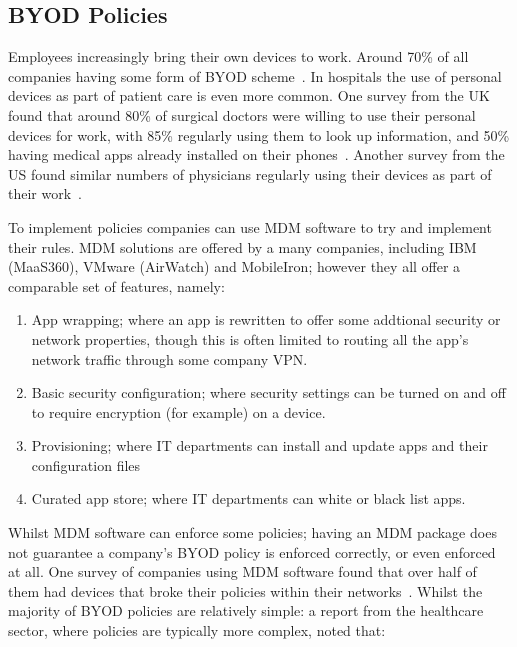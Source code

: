 \documentclass[a4paper]{scrartcl}
\begin{document}
\subsection{BYOD Policies}
\label{sec:byod}

Employees increasingly bring their own devices to work. Around 70\% of all
companies having some form of \ac{BYOD} scheme~\cite{schulze_byod_2016}. In
hospitals the use of personal devices as part of patient care is even more
common. One survey from the UK found that around 80\% of surgical doctors were
willing to use their personal devices for work, with 85\% regularly using them
to look up information, and 50\% having medical apps already installed on their
phones~\cite{patel_uk_2015}. Another survey from the US found similar numbers of
physicians regularly using their devices as part of their
work~\cite{moyer_managing_2013}.

To implement policies companies can use \ac{MDM} software to try and implement
their rules.  \ac{MDM} solutions are offered by a many companies, including IBM
(MaaS360), VMware (AirWatch) and MobileIron; however they all offer a
comparable set of features, namely:
\begin{enumerate}
\item App wrapping; where an app is rewritten to offer some addtional security
  or network properties, though this is often limited to routing all the app's
  network traffic through some company VPN.
\item Basic security configuration; where security settings can be turned on and
  off to require encryption (for example) on a device.
\item Provisioning; where IT departments can install and update apps and
  their configuration files
\item Curated app store; where IT departments can white or black list apps.
\end{enumerate}



Whilst \ac{MDM} software can enforce some policies; having an \ac{MDM} package
does not guarantee a company's BYOD policy is enforced correctly, or even
enforced at all. One survey of companies using \ac{MDM} software found that over
half of them had devices that broke their policies within their
networks~\cite{mobileiron_security_labs_q4_2015}. Whilst the majority of BYOD
policies are relatively simple: a report from the healthcare sector, where
policies are typically more complex, noted that:
\end{document}

